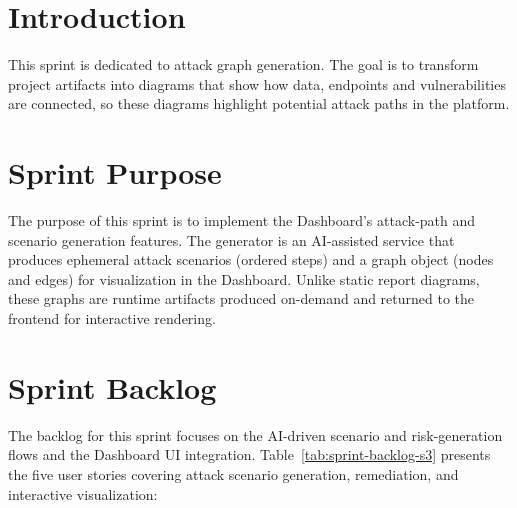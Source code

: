﻿\section{Introduction}

\justifying
This sprint is dedicated to attack graph generation. The goal is to transform project artifacts into diagrams that show how data, endpoints and vulnerabilities are connected, so these diagrams highlight potential attack paths in the platform.

\section{Sprint Purpose}

\justifying
The purpose of this sprint is to implement the Dashboard's attack-path and scenario generation features. The generator is an AI-assisted service that produces ephemeral attack scenarios (ordered steps) and a graph object (nodes and edges) for visualization in the Dashboard. Unlike static report diagrams, these graphs are runtime artifacts produced on-demand and returned to the frontend for interactive rendering.

\section{Sprint Backlog}

The backlog for this sprint focuses on the AI-driven scenario and risk-generation flows and the Dashboard UI integration. Table~\ref{tab:sprint-backlog-s3} presents the five user stories covering attack scenario generation, remediation, and interactive visualization:

